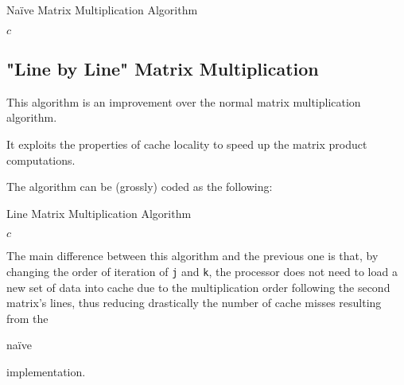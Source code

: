 \documentclass[11pt,a4paper]{article}
\begin{document}
\begin{algorithm}
    \caption{Naïve Matrix Multiplication Algorithm}
    \begin{algorithmic}[1]
                    \EndFor
                \EndFor
            \EndFor
            \State \Return $c$
        \EndFunction
    \end{algorithmic}
\end{algorithm}

\subsection{"Line by Line" Matrix Multiplication}

This algorithm is an improvement over the normal matrix multiplication algorithm.

It exploits the properties of cache locality to speed up the matrix product computations.

The algorithm can be (grossly) coded as the following:
\begin{algorithm}
    \caption{Line Matrix Multiplication Algorithm}
    \begin{algorithmic}[1]
                    \EndFor
                \EndFor
            \EndFor
            \State \Return $c$
        \EndFunction
    \end{algorithmic}
\end{algorithm}

The main difference between this algorithm and the previous one is that, by changing the order of iteration of \lstinline{j} and \lstinline{k}, the processor does not need to load a new set of data into cache due to the multiplication order following the second matrix's lines, thus reducing drastically the number of cache misses resulting from the \begin{em}naïve\end{em} implementation.
\end{document}
